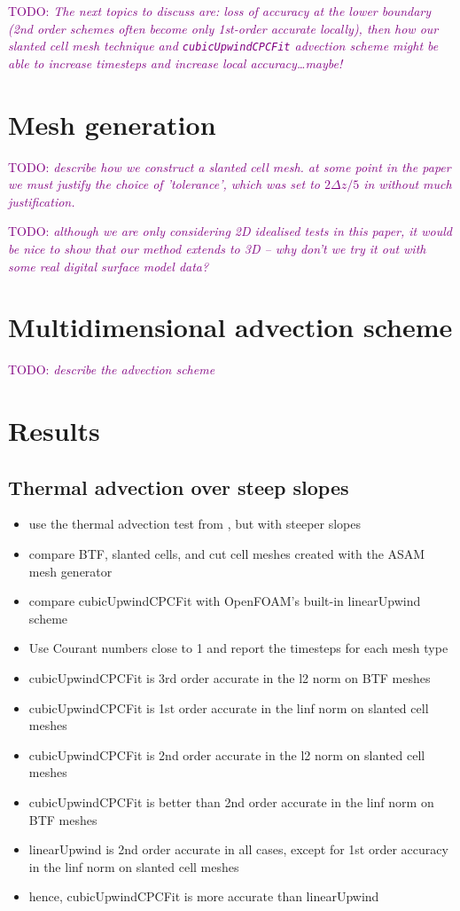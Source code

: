 \documentclass{article}
\newcommand{\TODO}[1]{\textcolor{purple}{TODO: \emph{#1}}}
\begin{document}
\vspace*{2em}


\TODO{The next topics to discuss are: loss of accuracy at the lower boundary (2nd order schemes often become only 1st-order accurate locally), then how our slanted cell mesh technique and \texttt{cubicUpwindCPCFit} advection scheme might be able to increase timesteps and increase local accuracy\ldots maybe!}

\section{Mesh generation}
\TODO{describe how we construct a slanted cell mesh.  at some point in the paper we must justify the choice of 'tolerance', which was set to $2\Delta z/5$ in \citet{shaw-weller2016} without much justification.}

\TODO{although we are only considering 2D idealised tests in this paper, it would be nice to show that our method extends to 3D -- why don't we try it out with some real digital surface model data?}

\section{Multidimensional advection scheme}
\TODO{describe the advection scheme}

\section{Results}

\subsection{Thermal advection over steep slopes}
\begin{itemize}
	\item use the thermal advection test from \citet{shaw-weller2016}, but with steeper slopes
	\item compare BTF, slanted cells, and cut cell meshes created with the ASAM mesh generator
	\item compare cubicUpwindCPCFit with OpenFOAM's built-in linearUpwind scheme
	\item Use Courant numbers close to 1 and report the timesteps for each mesh type
	\item cubicUpwindCPCFit is 3rd order accurate in the l2 norm on BTF meshes
	\item cubicUpwindCPCFit is 1st order accurate in the linf norm on slanted cell meshes
	\item cubicUpwindCPCFit is 2nd order accurate in the l2 norm on slanted cell meshes
	\item cubicUpwindCPCFit is better than 2nd order accurate in the linf norm on BTF meshes
	\item linearUpwind is 2nd order accurate in all cases, except for 1st order accuracy in the linf norm on slanted cell meshes
	\item hence, cubicUpwindCPCFit is more accurate than linearUpwind
\end{itemize}
\end{document}
